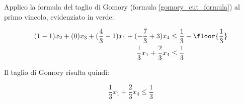 \documentclass[\main/main.tex]{subfiles}
\begin{document}
Applico la formula del taglio di Gomory (formula \ref{gomory_cut_formula}) al primo vincolo, evidenziato in verde:

\begin{align*}
  (1-1)x_2 + (0)x_3 + (\frac{4}{3}-1)x_1 + (-\frac{7}{3} + 3)x_4 & \leq \frac{1}{3} - \floor{\frac{1}{3}} \\
  \frac{1}{3}x_1 + \frac{2}{3}x_4                                & \leq \frac{1}{3}
\end{align*}

Il taglio di Gomory risulta quindi:

\[
  \frac{1}{3}x_1 + \frac{2}{3}x_4 \leq \frac{1}{3}
\]
\end{document}
